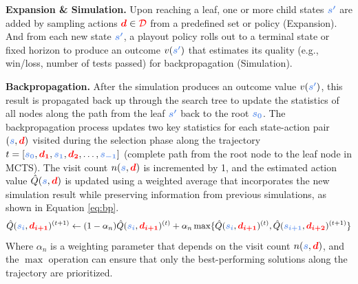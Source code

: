 \documentclass{article} %
\theoremstyle{definition}
\theoremstyle{remark}
\begin{document}
\textbf{Expansion \& Simulation.} Upon reaching a leaf, one or more child states $\textcolor{lightblue}{\boldsymbol{s'}}$ are added by sampling actions $\textcolor{red}{\boldsymbol{d}}\in\textcolor{red}{\mathcal{D}}$ from a predefined set or policy (Expansion). And from each new state $\textcolor{lightblue}{\boldsymbol{s'}}$, a playout policy rolls out to a terminal state or fixed horizon to produce an outcome $v(\textcolor{lightblue}{\boldsymbol{s'}})$ that estimates its quality (e.g., win/loss, number of tests passed) for backpropagation (Simulation).



\textbf{Backpropagation.} After the simulation produces an outcome value $v(\textcolor{lightblue}{\boldsymbol{s'}})$, this result is propagated back up through the search tree to update the statistics of all nodes along the path from the leaf $\textcolor{lightblue}{\boldsymbol{s'}}$ back to the root $\textcolor{lightblue}{\boldsymbol{s_0}}$. The backpropagation process updates two key statistics for each state-action pair $(\textcolor{lightblue}{\boldsymbol{s}}, \textcolor{red}{\boldsymbol{d}})$ visited during the selection phase along the trajectory $t = [\textcolor{lightblue}{\boldsymbol{s_0}}, \textcolor{red}{\boldsymbol{d_1}}, \textcolor{lightblue}{\boldsymbol{s_1}}, \textcolor{red}{\boldsymbol{d_2}}, \ldots, \textcolor{lightblue}{\boldsymbol{s_{-1}}}]$ (complete path from the root node to the leaf node in MCTS). The visit count $n(\textcolor{lightblue}{\boldsymbol{s}}, \textcolor{red}{\boldsymbol{d}})$ is incremented by 1, and the estimated action value $\hat{Q}(\textcolor{lightblue}{\boldsymbol{s}}, \textcolor{red}{\boldsymbol{d}})$ is updated using a weighted average that incorporates the new simulation result while preserving information from previous simulations, as shown in Equation \ref{eq:bp}.
\begin{equation}
\label{eq:bp}
\hat{Q}(\textcolor{lightblue}{\boldsymbol{s_i}}, \textcolor{red}{\boldsymbol{d_{i+1}}})^{(t+1)} \leftarrow (1 - \alpha_n)\hat{Q}(\textcolor{lightblue}{\boldsymbol{s_i}}, \textcolor{red}{\boldsymbol{d_{i+1}}})^{(t)} + \alpha_n \max\{\hat{Q}(\textcolor{lightblue}{\boldsymbol{s_i}}, \textcolor{red}{\boldsymbol{d_{i+1}}})^{(t)}, \hat{Q}(\textcolor{lightblue}{\boldsymbol{s_{i+1}}}, \textcolor{red}{\boldsymbol{d_{i+2}}})^{(t+1)}\}
\end{equation}
Where $\alpha_n$ is a weighting parameter that depends on the visit count $n(\textcolor{lightblue}{\boldsymbol{s}}, \textcolor{red}{\boldsymbol{d}})$, and the $\max$ operation can ensure that only the best-performing solutions along the trajectory are prioritized. 
\end{document}
